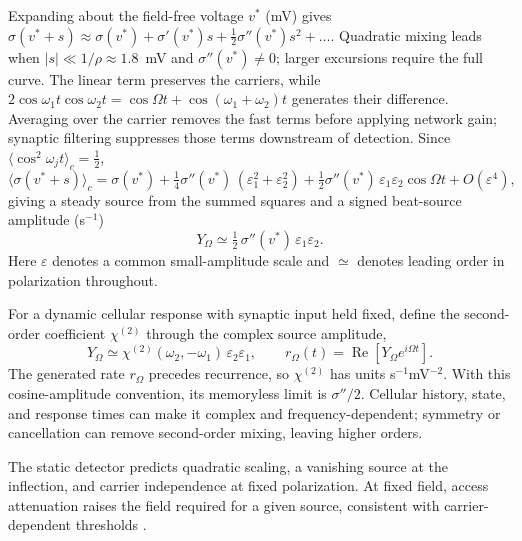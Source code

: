 \documentclass[a4paper]{article}
\newcommand{\Sig}{\sigma}
\newcommand{\half}{\tfrac{1}{2}}
\begin{document}
Expanding about the field-free voltage $v^*$ (mV)
\cite{ruffini2025ham} gives
$\Sig(v^*+s)\approx\Sig(v^*)+\Sig'(v^*)s+\half\Sig''(v^*)s^2+\dots$.
Quadratic mixing leads when $|s|\ll1/\rho\approx1.8$~mV and
$\Sig''(v^*)\ne0$; larger excursions require the full curve.
The linear term preserves the carriers, while
$2\cos\omega_1t\cos\omega_2t=\cos\Omega t+\cos(\omega_1+\omega_2)t$
generates their difference. Averaging over the carrier removes the fast terms
before applying network gain; synaptic filtering suppresses those terms
downstream of detection. Since $\langle\cos^2\omega_jt\rangle_c=\half$,
\begin{equation}
\big\langle\Sig(v^*+s)\big\rangle_c
=\Sig(v^*)+\tfrac14\Sig''(v^*)\,(\varepsilon_1^2+\varepsilon_2^2)
+\tfrac12\Sig''(v^*)\,\varepsilon_1\varepsilon_2\cos\Omega t+O(\varepsilon^4),
\label{eq:taylor}
\end{equation}
giving a steady source from the summed squares and a signed beat-source amplitude (s$^{-1}$)
\begin{equation}
Y_\Omega\simeq\half\,\Sig''(v^*)\,\varepsilon_1\varepsilon_2 .
\label{eq:demod}
\end{equation}
Here $\varepsilon$ denotes a common small-amplitude scale and $\simeq$
denotes leading order in polarization throughout.

For a dynamic cellular response with synaptic input held fixed, define
the second-order coefficient $\chi^{(2)}$ through the complex source amplitude,
\begin{equation}
Y_\Omega\simeq\chi^{(2)}(\omega_2,-\omega_1)\,
\varepsilon_2\varepsilon_1,\qquad
r_\Omega(t)=\operatorname{Re}\!\left[Y_\Omega e^{i\Omega t}\right].
\label{eq:chi2}
\end{equation}
The generated rate $r_\Omega$ precedes recurrence, so $\chi^{(2)}$ has units
s$^{-1}$mV$^{-2}$. With this cosine-amplitude convention, its memoryless
limit is $\Sig''/2$. Cellular history, state, and response times can make
it complex and frequency-dependent; symmetry or cancellation can remove
second-order mixing, leaving higher orders.

The static detector predicts quadratic scaling, a vanishing source at the
inflection, and carrier independence at fixed polarization. At fixed field,
access attenuation raises the field required for a given source, consistent
with carrier-dependent thresholds \cite{opancar2025,peripheral2023}.
\end{document}
